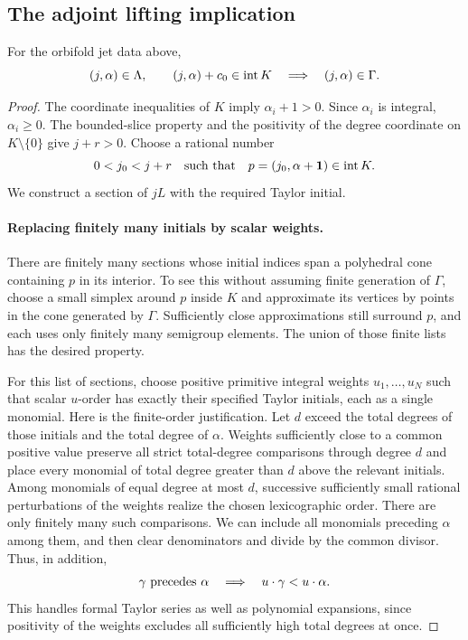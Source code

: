 \subsection{The adjoint lifting implication}

\begin{lemma}\label{adj:implication}
For the orbifold jet data above,
\begin{equation}\label{adj:adjoint-implication}
 (j,\alpha)\in\Lambda,\qquad
 (j,\alpha)+c_0\in\operatorname{int} K
 \quad\Longrightarrow\quad (j,\alpha)\in\Gamma.
\end{equation}
\end{lemma}

\begin{proof}
The coordinate inequalities of $K$ imply
$\alpha_i+1>0$.  Since $\alpha_i$ is integral, $\alpha_i\ge0$.
The bounded-slice property and the positivity of the degree coordinate
on $K\setminus\{0\}$ give $j+r>0$.  Choose a rational number
\[
 0<j_0<j+r
 \quad\hbox{such that}\quad
 p=(j_0,\alpha+\mathbf1)\in\operatorname{int} K.
\]
We construct a section of $jL$ with the required Taylor initial.

\paragraph{Replacing finitely many initials by scalar weights.}
There are finitely many sections whose initial indices span a
polyhedral cone containing $p$ in its interior.  To see this without
assuming finite generation of $\Gamma$, choose a small simplex around
$p$ inside $K$ and approximate its vertices by points in the cone
generated by $\Gamma$.  Sufficiently close approximations still
surround $p$, and each uses only finitely many semigroup elements.
The union of those finite lists has the desired property.

For this list of sections, choose positive primitive integral weights
$u_1,\ldots,u_N$ such that scalar $u$-order has exactly their specified
Taylor initials, each as a single monomial.  Here is the finite-order
justification.  Let $d$ exceed the total degrees of those initials
and the total degree of $\alpha$.  Weights sufficiently close to a
common positive value preserve all strict total-degree comparisons
through degree $d$ and place every monomial of total degree greater
than $d$ above the relevant initials.  Among monomials of equal
degree at most $d$, successive sufficiently small rational
perturbations of the weights realize the chosen lexicographic order.
There are only finitely many such comparisons.  We can include all
monomials preceding $\alpha$ among them, and then clear denominators
and divide by the common divisor.  Thus, in addition,
\begin{equation}\label{adj:scalar-order-choice}
 \gamma\hbox{ precedes }\alpha
       \quad\Longrightarrow\quad u\cdot\gamma<u\cdot\alpha.
\end{equation}
This handles formal Taylor series as well as polynomial expansions,
since positivity of the weights excludes all sufficiently high total
degrees at once.


\end{proof}
